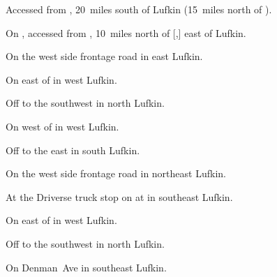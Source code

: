 
\begin{LocationList}

Accessed from , 20~miles south of Lufkin (15~miles north of ).

On , accessed from , 10~miles north of [,] east of Lufkin.

\Location{\GarageHQ \Garage}
On the west side   frontage road in east Lufkin.

On  east of  in west Lufkin.

Off   to the southwest in north Lufkin.

On  west of  in west Lufkin.

Off  to the east in south Lufkin.

\Location{\TruckService \Service}
On the west side   frontage road in northeast Lufkin.

At the Driverse truck stop on  at  in southeast Lufkin.

On  east of  in west Lufkin.

Off   to the southwest in north Lufkin.

On  Denman~Ave in southeast Lufkin.

\end{LocationList}
